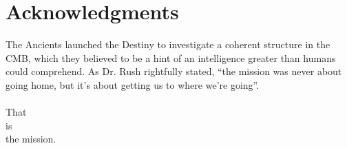 
\section*{Acknowledgments}
\lhead[\fancyplain{}{\thepage}]{\fancyplain{}{\rightmark}}
 \thispagestyle{plain}


	The Ancients launched the Destiny to investigate a coherent structure in the CMB, which they believed to be a hint of an intelligence greater than humans could comprehend. As Dr. Rush rightfully stated, ``the mission was never about going home, but it's about getting us to where we're going''. \\ \\
	That \\
	is \\
	the mission.


\clearpage


\thispagestyle{plain}
\par{}
\clearpage

